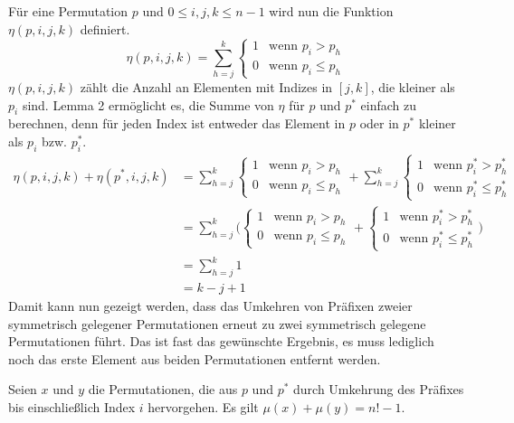 \documentclass[a4paper, 10pt, ngerman]{article}
\begin{document}
Für eine Permutation $p$ und $0 \le i, j, k \le n - 1$ wird nun die Funktion $\eta(p, i, j, k)$ definiert.
$$
    \eta(p, i, j, k) = \sum_{h = j}^k
    \begin{cases}
        1 & \text{wenn } p_i > p_h   \\
        0 & \text{wenn } p_i \le p_h
    \end{cases}
$$
$\eta(p, i, j, k)$ zählt die Anzahl an Elementen mit Indizes in $[j, k]$, die kleiner als $p_i$ sind. Lemma 2 ermöglicht es, die Summe von $\eta$ für $p$ und $p^*$ einfach zu berechnen, denn für jeden Index ist entweder das Element in $p$ oder in $p^*$ kleiner als $p_i$ bzw. $p^*_i$.
\begin{align*}
    \eta(p, i, j, k) + \eta(p^*, i, j, k) & = \sum_{h = j}^k
    \begin{cases}
        1 & \text{wenn } p_i > p_h   \\
        0 & \text{wenn } p_i \le p_h
    \end{cases} + \sum_{h = j}^k
    \begin{cases}
        1 & \text{wenn } p^*_i > p^*_h   \\
        0 & \text{wenn } p^*_i \le p^*_h
    \end{cases}                                 \\
                                          & = \sum_{h = j}^k \Bigg (
    \begin{cases}
            1 & \text{wenn } p_i > p_h   \\
            0 & \text{wenn } p_i \le p_h
        \end{cases} +
    \begin{cases}
            1 & \text{wenn } p^*_i > p^*_h   \\
            0 & \text{wenn } p^*_i \le p^*_h
        \end{cases} \Bigg )                                 \\
                                          & = \sum_{h = j}^k 1       \\
                                          & = k - j + 1
\end{align*}
Damit kann nun gezeigt werden, dass das Umkehren von Präfixen zweier symmetrisch gelegener Permutationen erneut zu zwei symmetrisch gelegene Permutationen führt. Das ist fast das gewünschte Ergebnis, es muss lediglich noch das erste Element aus beiden Permutationen entfernt werden.

\begin{lemma}Seien $x$ und $y$ die Permutationen, die aus $p$ und $p^*$ durch Umkehrung des Präfixes bis einschließlich Index $i$ hervorgehen. Es gilt $\mu(x) + \mu(y) = n! - 1$.
\end{lemma}
\end{document}
